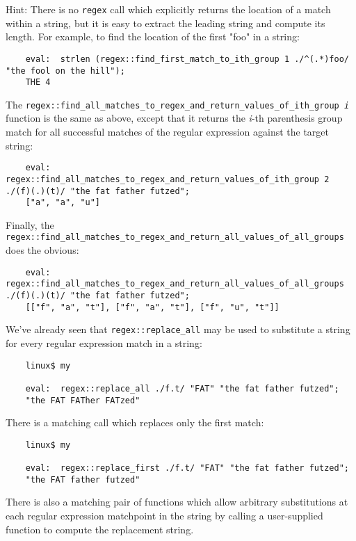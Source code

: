 Hint:  There is no {\tt regex} call which explicitly returns the location 
of a match within a string, but it is easy to extract the leading string and 
compute its length.  For example, to find the location of the first "foo" in 
a string:

\begin{verbatim}
    eval:  strlen (regex::find_first_match_to_ith_group 1 ./^(.*)foo/ "the fool on the hill");
    THE 4
\end{verbatim}


The {\tt regex::find\_all\_matches\_to\_regex\_and\_return\_values\_of\_ith\_group {\it i}} function is the same as above, except that it 
returns the {\it i}-th parenthesis group match for all successful matches 
of the regular expression against the target string:

\begin{verbatim}
    eval:  regex::find_all_matches_to_regex_and_return_values_of_ith_group 2 ./(f)(.)(t)/ "the fat father futzed";
    ["a", "a", "u"]
\end{verbatim}

Finally, the {\tt regex::find\_all\_matches\_to\_regex\_and\_return\_all\_values\_of\_all\_groups} does the obvious:
\begin{verbatim}
    eval:  regex::find_all_matches_to_regex_and_return_all_values_of_all_groups ./(f)(.)(t)/ "the fat father futzed";
    [["f", "a", "t"], ["f", "a", "t"], ["f", "u", "t"]]
\end{verbatim}


We've already seen that {\tt regex::replace\_all} may be used to substitute 
a string for every regular expression match in a string:

\begin{verbatim}
    linux$ my

    eval:  regex::replace_all ./f.t/ "FAT" "the fat father futzed";
    "the FAT FATher FATzed"
\end{verbatim}

There is a matching call which replaces only the first match:

\begin{verbatim}
    linux$ my

    eval:  regex::replace_first ./f.t/ "FAT" "the fat father futzed";
    "the FAT father futzed"
\end{verbatim}

There is also a matching pair of functions which allow arbitrary substitutions 
at each regular expression matchpoint in the string by calling a 
user-supplied function to compute the replacement string.

